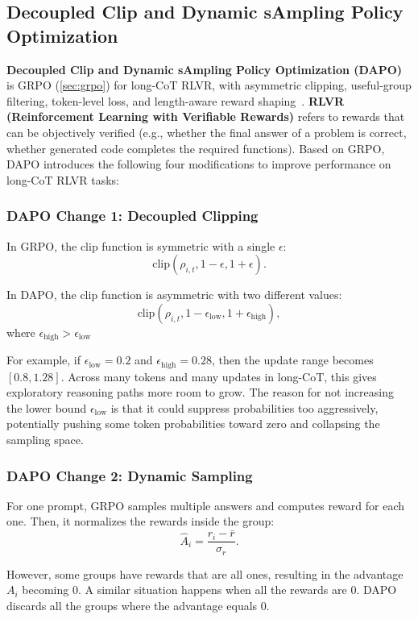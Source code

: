\subsection{Decoupled Clip and Dynamic sAmpling Policy Optimization}

\textbf{Decoupled Clip and Dynamic sAmpling Policy Optimization (DAPO)} is GRPO (\ref{sec:grpo}) for long-CoT RLVR, with asymmetric clipping, useful-group filtering, token-level loss, and length-aware reward shaping~\cite{yu2026dapo}. \textbf{RLVR (Reinforcement Learning with Verifiable Rewards)} refers to rewards that can be objectively verified (e.g., whether the final answer of a problem is correct, whether generated code completes the required functions). Based on GRPO, DAPO introduces the following four modifications to improve performance on long-CoT RLVR tasks:

\subsubsection{DAPO Change 1: Decoupled Clipping}

In GRPO, the clip function is symmetric with a single \(\epsilon\):
\[
	\text{clip}(\rho_{i,t}, 1 - \epsilon, 1 + \epsilon).
\]

In DAPO, the clip function is asymmetric with two different values:
\[
	\text{clip}(\rho_{i,t}, 1 - \epsilon_\text{low}, 1 + \epsilon_\text{high}),
\]
where \(\epsilon_\text{high} > \epsilon_\text{low} \)

For example, if \(\epsilon_\text{low} = 0.2\) and \(\epsilon_\text{high} = 0.28\), then the update range becomes \([0.8, 1.28]\). Across many tokens and many updates in long-CoT, this gives exploratory reasoning paths more room to grow. The reason for not increasing the lower bound \(\epsilon_\text{low}\) is that it could suppress probabilities too aggressively, potentially pushing some token probabilities toward zero and collapsing the sampling space.

\subsubsection{DAPO Change 2: Dynamic Sampling}

For one prompt, GRPO samples multiple answers and computes reward for each one. Then, it normalizes the rewards inside the group:
\[
	\hat{A}_{i} = \frac{r_i - \bar{r}}{\sigma_r}.
\]

However, some groups have rewards that are all ones, resulting in the advantage \(A_i\) becoming \(0\). A similar situation happens when all the rewards are \(0\). DAPO discards all the groups where the advantage equals \(0\).

